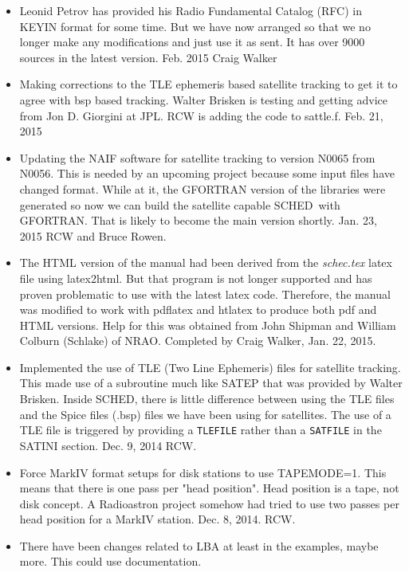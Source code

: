 \documentclass{report}
\newcommand{\schedb}{{\sc SCHED~}}
\begin{document}
\begin{itemize}
\item Leonid Petrov has provided his Radio Fundamental Catalog (RFC)
in KEYIN format for some time.  But we have now arranged so that we
no longer make any modifications and just use it as sent.  It has
over 9000 sources in the latest version.  Feb. 2015 Craig Walker

\item Making corrections to the TLE ephemeris based satellite tracking
to get it to agree with bsp based tracking.  Walter Brisken is testing
and getting advice from Jon D. Giorgini at JPL.  RCW is adding the
code to sattle.f.  Feb. 21, 2015

\item Updating the NAIF software for satellite tracking to version
N0065 from N0056.  This is needed by an upcoming project because some
input files have changed format.  While at it, the GFORTRAN version
of the libraries were generated so now we can build the satellite
capable \schedb with GFORTRAN.  That is likely to become the main
version shortly.  Jan. 23, 2015  RCW and Bruce Rowen.

\item The HTML version of the manual had been derived from the {\sl
schec.tex} latex file using latex2html.  But that program is not
longer supported and has proven problematic to use with the latest
latex code.  Therefore, the manual was modified to work with pdflatex
and htlatex to produce both pdf and HTML versions.  Help for this was
obtained from John Shipman and William Colburn (Schlake) of NRAO.
Completed by Craig Walker, Jan. 22, 2015.

\item Implemented the use of TLE (Two Line Ephemeris) files for
satellite tracking.  This made use of a subroutine much like SATEP
that was provided by Walter Brisken.  Inside SCHED, there is little
difference between using the TLE files and the Spice files (.bsp)
files we have been using for satellites.  The use of a TLE file is
triggered by providing a {\tt TLEFILE} rather than a {\tt SATFILE} in
the SATINI section.  Dec. 9, 2014 RCW.

\item Force MarkIV format setups for disk stations to use TAPEMODE=1.
This means that there is one pass per "head position".  Head position
is a tape, not disk concept.  A Radioastron project somehow had 
tried to use two passes per head position for a MarkIV station.
Dec. 8, 2014.  RCW.

\item There have been changes related to LBA at least in the examples,
maybe more.  This could use documentation.


\end{itemize}
\end{document}
